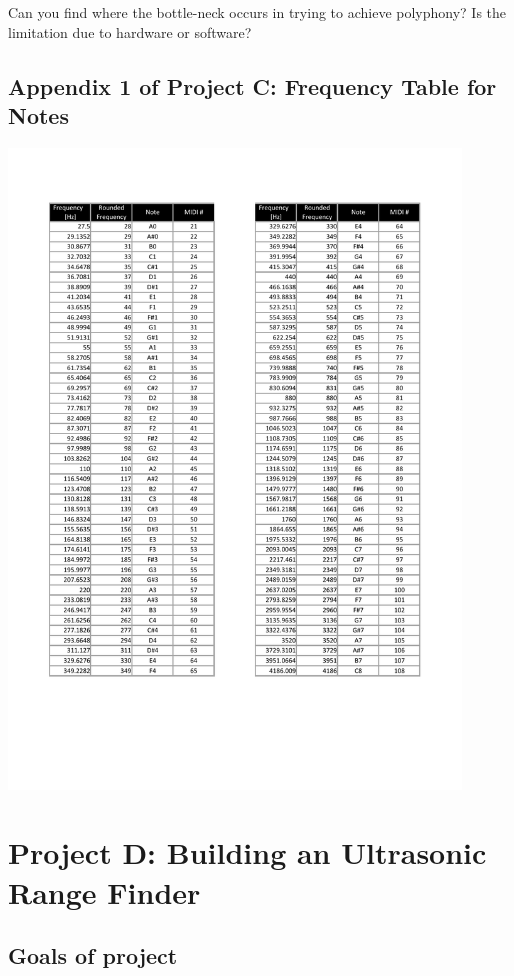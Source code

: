 Can you find where the bottle-neck occurs in trying to achieve polyphony? Is the limitation due to hardware or software?




\subsection*{Appendix 1 of Project C: Frequency Table for Notes}
\vspace*{-1.0cm}
\begin{center}                                        
 {\includegraphics[width=0.90\textwidth]{figs/Frequency-table}}
 \end{center}
 
 
 \newpage
\section{Project D: Building an Ultrasonic Range Finder}

\subsection{Goals of project}

